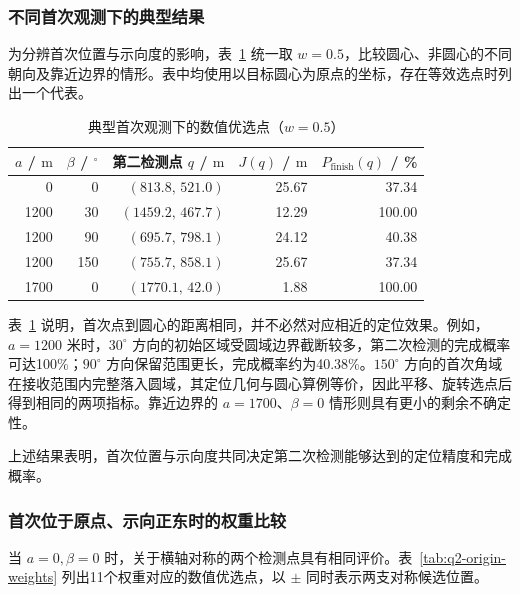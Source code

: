 \documentclass[UTF8,a4paper,zihao=-4,fontset=none]{ctexart}
\begin{document}
\subsubsection{不同首次观测下的典型结果}

为分辨首次位置与示向度的影响，表~\ref{tab:q2-typical-results} 统一取 \(w=0.5\)，比较圆心、非圆心的不同朝向及靠近边界的情形。表中均使用以目标圆心为原点的坐标，存在等效选点时列出一个代表。

\begin{table}[htbp]
  \centering
  \caption{典型首次观测下的数值优选点（\(w=0.5\)）}
  \label{tab:q2-typical-results}
  \small
  \renewcommand{\arraystretch}{1.08}
  \begin{tabular}{rrrrr}
    \toprule
    \(a\) / \(\mathrm{m}\) & \(\beta\) / \({}^\circ\) & 第二检测点 \(q\) / \(\mathrm{m}\) & \(J(q)\) / \(\mathrm{m}\) & \(P_{\mathrm{finish}}(q)\) / \% \\
    \midrule
    0 & 0 & \((813.8,\,521.0)\) & 25.67 & 37.34 \\
    1200 & 30 & \((1459.2,\,467.7)\) & 12.29 & 100.00 \\
    1200 & 90 & \((695.7,\,798.1)\) & 24.12 & 40.38 \\
    1200 & 150 & \((755.7,\,858.1)\) & 25.67 & 37.34 \\
    1700 & 0 & \((1770.1,\,42.0)\) & 1.88 & 100.00 \\
    \bottomrule
  \end{tabular}
\end{table}

表~\ref{tab:q2-typical-results} 说明，首次点到圆心的距离相同，并不必然对应相近的定位效果。例如，\(a=1200\) 米时，\(30^\circ\) 方向的初始区域受圆域边界截断较多，第二次检测的完成概率可达100\%；\(90^\circ\) 方向保留范围更长，完成概率约为40.38\%。\(150^\circ\) 方向的首次角域在接收范围内完整落入圆域，其定位几何与圆心算例等价，因此平移、旋转选点后得到相同的两项指标。靠近边界的 \(a=1700\)、\(\beta=0\) 情形则具有更小的剩余不确定性。

上述结果表明，首次位置与示向度共同决定第二次检测能够达到的定位精度和完成概率。

\subsubsection{首次位于原点、示向正东时的权重比较}

当 \(a=0,\beta=0\) 时，关于横轴对称的两个检测点具有相同评价。表~\ref{tab:q2-origin-weights} 列出11个权重对应的数值优选点，以 \(\pm\) 同时表示两支对称候选位置。
\end{document}
